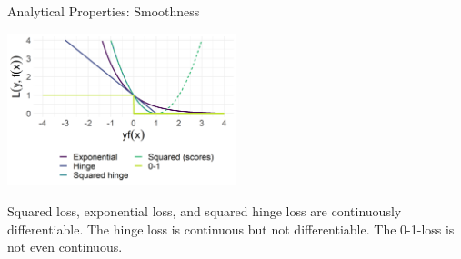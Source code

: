 \begin{vbframe}{Analytical Properties: Smoothness}
\begin{center}
  \includegraphics[width = 0.5\textwidth]{figure/plot_loss_overview_classif.png} \\
  \begin{footnotesize}
    Squared loss, exponential loss, and squared hinge loss are continuously differentiable. The hinge loss is continuous but not differentiable. The 0-1-loss is not even continuous.   
  \end{footnotesize}
\end{center}



\end{vbframe}


